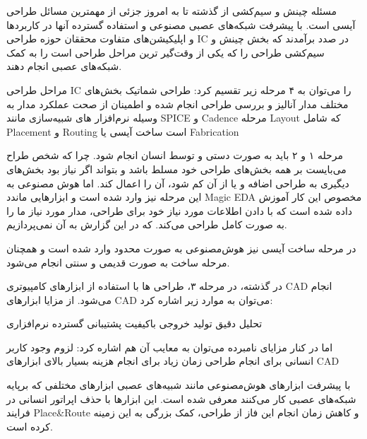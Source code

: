 

مسئله چینش و سیم‌کشی از گذشته تا به امروز جزئی از مهمترین مسائل طراحی آیسی است. با پیشرفت شبکه‌های عصبی مصنوعی و استفاده گسترده آنها در کاربرد‌ها و اپلیکیشن‌های متفاوت محققان حوزه طراحی IC در صدد برآمدند که بخش چینش و سیم‌کشی طراحی را که یکی از وقت‌گیر ترین مراحل طراحی است را به کمک شبکه‌های عصبی انجام دهند.








مراحل طراحی IC را می‌توان به ۴ مرحله زیر تقسیم کرد:
 طراحی شماتیک بخش‌های مختلف مدار
 آنالیز و بررسی طراحی انجام شده و اطمینان از صحت عملکرد مدار به وسیله نرم‌افزار های شبیه‌سازی مانند SPICE و Cadence
 مرحله Layout که شامل Placement و Routing است
 ساخت آیسی یا Fabrication

مرحله ۱ و ۲ باید به صورت دستی و توسط انسان انجام شود. چرا که شخص طراح می‌بایست بر همه بخش‌های طراحی خود مسلط باشد و بتواند اگر نیاز بود بخش‌های دیگیری به طراحی اضافه و یا از آن کم شود، آن را اعمال کند. اما هوش مصنوعی به این مرحله نیز وارد شده است و ابزار‌هایی ماندد Magic EDA مخصوص این کار آموزش داده شده است که با دادن اطلاعات مورد نیاز خود برای طراحی، مدار مورد نیاز ما را به صورت کامل طراحی می‌کند. که در این گزارش به آن نمی‌پردازیم.


در مرحله ساخت آیسی نیز هوش‌مصنوعی به صورت محدود وارد شده است و همچنان مرحله ساخت به صورت قدیمی و سنتی انجام می‌شود.


در گذشته، در مرحله ۳، طراحی‌ ها با استفاده از ابزار‌های کامپیوتری CAD انجام می‌شود. از مزایا ابزار‌های CAD می‌توان به موارد زیر اشاره کرد:

 تحلیل‌ دقیق
 تولید خروجی باکیفیت
 پشتیبانی گسترده نرم‌افزاری

اما در کنار مزایای نامبرده می‌توان به معایب آن هم اشاره کرد:
 لزوم وجود کاربر انسانی برای انجام طراحی
 زمان زیاد برای انجام
 هزینه بسیار بالای ابزار‌های CAD


با پیشرفت ابزار‌های هوش‌مصنوعی مانند شبیه‌های عصبی ابزار‌های مختلفی که برپایه شبکه‌های عصبی کار می‌کنند معرفی شده است.  این ابزار‌ها با حذف اپراتور انسانی در فرایند Place\&Route و کاهش زمان انجام این فاز از طراحی، کمک بزرگی به این زمینه کرده است.



